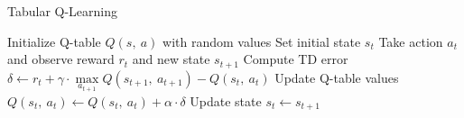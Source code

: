 \begin{algorithm}[H]
  \caption{Tabular Q-Learning}
  \label{alg:q_learning}
  \begin{algorithmic}
    \State Initialize Q-table $Q(s,~a)$ with random values
    \State Set initial state $s_t$
    \State Take action $a_t$ and observe reward $r_t$ and new state $s_{t+1}$
    \State Compute TD error $\delta \gets r_t+\gamma\cdot\max\limits_{a_{t+1}} Q(s_{t+1},~a_{t+1}) - Q(s_t,~a_t)$
    \State Update Q-table values $Q(s_{t},~a_{t})\leftarrow Q(s_{t},~a_{t})+\alpha\cdot\delta$
    \State Update state $s_t \gets s_{t+1}$
    \EndWhile
    \EndFor
  \end{algorithmic}
\end{algorithm}
